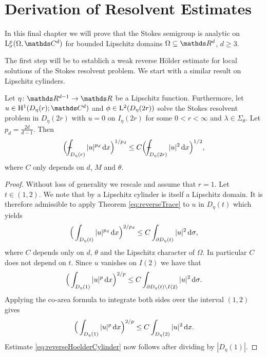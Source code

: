 \chapter{Derivation of Resolvent Estimates}

In this final chapter we will prove that the Stokes semigroup is analytic on $\Ell^p_\sigma(\Omega, \C^d)$ for bounded Lipschitz domains $\Omega \subseteq \R^d$, $d \geq 3$.

The first step will be to establich a weak reverse H\"older estimate for local solutions of the Stokes resolvent problem. 
We start with a similar result on Lipschitz cylinders.

\begin{lem}
  \label{lem:reverseHoelderCylinder}
  Let $\eta \colon \R^{d - 1} \to \R$ be a Lipschitz function.
  Furthermore, let $u \in \HH^1(D_\eta(r); \C^d)$ and $\phi \in \mathrm{L}^2(D_\eta(2r))$ solve the Stokes resolvent problem in $D_\eta(2r)$ with $u = 0$ on $I_\eta(2r)$ for some $0 < r < \infty$ and $\lambda \in \Sigma_\theta$.
  Let $p_d = \frac{2d}{d - 1}$.
  Then 
  \begin{align}
    \label{eq:reverseHoelderCylinder}
    \Big( \dashint_{D_\eta(r)} |u|^{p_d} \d x \Big)^{1/p_d} \leq C \Big( \dashint_{D_\eta(2r)} |u|^2 \d x \Big)^{1/2},
  \end{align}
  where $C$ only depends on $d$, $M$ and $\theta$.
\end{lem}

\begin{proof}
  Without loss of generality we rescale and assume that $r = 1$.
  Let $t \in (1,2)$. 
  We note that by \cite[Lemma 1.3.25]{tolksdorf} a Lipschitz cylinder is itself a Lipschitz domain.
  It is therefore admissible to apply Theorem \ref{eq:reverseTrace} to $u$ in $D_\eta(t)$ which yields
  \begin{align*}
    \Big( \int_{D_\eta(t)} |u|^{p_d} \, {\operatorname{d}\!{x}} \Big)^{2/p_d} \leq C \int_{\partial D_\eta(t)} |u|^2 \, {\operatorname{d}\!{\sigma}},
  \end{align*}
  where $C$ depends only on $d$, $\theta$ and the Lipschitz character of $\Omega$. In particular $C$ does not depend on $t$.
  Since $u$ vanishes on $I(2)$ we have that
  \begin{align*}
    \Big( \int_{D_\eta(1)} |u|^p \, {\operatorname{d}\!{x}} \Big)^{2/p} \leq C \int_{\partial D_\eta(t) \setminus I(2)} |u|^2 \, {\operatorname{d}\!{\sigma}}.
  \end{align*}
  Applying the co-area formula to integrate both sides over the interval $(1,2)$ gives
  \begin{align*}
    \Big( \int_{D_\eta(1)} |u|^p \, {\operatorname{d}\!{x}} \Big)^{2/p} \leq C \int_{D_\eta(2)} |u|^2 \, {\operatorname{d}\!{x}}.
  \end{align*}
  Estimate \eqref{eq:reverseHoelderCylinder} now follows after dividing by $|D_\eta(1)|$.
\end{proof}

